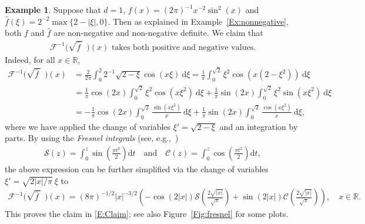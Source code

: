 \documentclass[a4paper,11pt]{article}%
\theoremstyle{plain}
\theoremstyle{definition}
\newtheorem{example}[theorem]{Example}
\numberwithin{equation}{section}
\newcommand{\R}{\mathbb{R}}
\newcommand{\ud}{\ensuremath{\mathrm{d}}}
\begin{document}
\begin{example}\label{Ex:Finv}
  Suppose that $d = 1$, $f(x) = (2\pi)^{-1}x^{-2}\sin^2 (x)$ and $\widehat{f}(\xi) =
  2^{-2}\max\{2-|\xi|,0\}$. Then as explained in Example~\ref{Ex:nonnegative}, both $f$ and
  $\widehat{f}$ are non-negative and non-negative definite. We claim that
	\begin{align}\label{E:Claim}
	\text{$\mathcal{F}^{-1}\big(\sqrt{\widehat{f}\:}\:\:\big)(x)$ takes both positive and negative values.}
	\end{align}
	Indeed, for all $x\in\R$,
	\begin{align*}
    \mathcal{F}^{-1}\big(\sqrt{\widehat{f}\:}\:\:\big)(x)
    & = \frac{2}{2\pi} \int_0^2 2^{-1}\sqrt{2-\xi} \cos(x \xi) \: \ud \xi
      = \frac{1}{\pi} \int_0^{\sqrt{2}} \xi^2 \cos\left(x\left(2-\xi^2\right)\right) \: \ud \xi \\
    & = \frac{1}{\pi}\cos(2x) \int_0^{\sqrt{2}} \xi^2 \cos(x \xi^2) \: \ud \xi + \frac{1}{\pi} \sin(2x) \int_0^{\sqrt{2}} \xi^2 \sin(x \xi^2) \: \ud \xi \\
    & = - \frac{1}{\pi} \cos(2x) \int_0 ^{\sqrt{2}} \frac{\sin(x \xi^2)}{x} \: \ud \xi + \frac{1}{\pi} \sin(2x) \int_0 ^{\sqrt{2}} \frac{\cos(x \xi^2)}{x} \: \ud \xi,
  \end{align*}
  where we have applied the change of variables $\xi' = \sqrt{2 - \xi}$ and an integration by parts.
  By using the \textit{Fresnel integrals} (see, e.g.,~\cite[7.2 (iii)]{olver.lozier.ea:10:nist})
  \begin{align*}
    \mathcal{S}(z) = \int_0^{z} \sin\left(\frac{\pi t^2}{2}\right) \ud t \quad \text{and} \quad
    \mathcal{C}(z) = \int_0^z \cos\left(\frac{\pi t^2}{2}\right) \ud t,
	\end{align*}
	the above expression can be further simplified via the change of variables $\xi' = \sqrt{2|x|/\pi}
	\: \xi$ to
	\begin{align*}
	\mathcal{F}^{-1}\big(\sqrt{\widehat{f}\:}\:\:\big)(x)
	= (8\pi)^{-1/2} |x|^{-3/2} \left(-\cos(2|x|)\mathcal{S}\left(\frac{2\sqrt{|x|}}{\sqrt{\pi}}\right) + \sin(2|x|) \mathcal{C}\left( \frac{2 \sqrt{|x|}}{\sqrt{\pi}} \right) \right), \quad x \in \R.
	\end{align*}
  This proves the claim in \eqref{E:Claim}; see also Figure~\ref{Fig:fresnel} for some plots.
\end{example}
\end{document}
